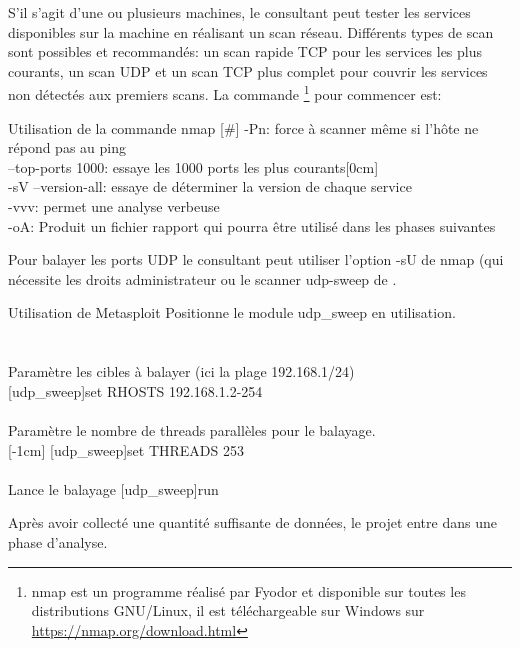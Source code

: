 \documentclass[twoside,a4paper,12pt,titlepage]{book}
\newcommand{\MarginPar}[2]{\marginnote{\scriptsize #1}[#2]}
\begin{document}
	S'il s'agit d'une ou plusieurs machines, le consultant peut tester les services disponibles sur la machine en réalisant un scan réseau. Différents types de scan sont possibles et recommandés: un scan rapide TCP pour les services les plus courants, un scan UDP et un scan TCP plus complet pour couvrir les services non détectés aux premiers scans. La commande \footnote{nmap est un programme réalisé par Fyodor et disponible sur toutes les distributions GNU/Linux, il est téléchargeable sur Windows sur \url{https://nmap.org/download.html}} pour commencer est:
\begin{FlagConsole}{Utilisation de la commande nmap}
[\#]
\tcblower
-Pn: force à scanner même si l'hôte ne répond pas au ping\\
--top-ports 1000: essaye les 1000 ports les plus courants\MarginPar{\textbf{Scan Réseau TCP}}{0cm}\\
-sV --version-all: essaye de déterminer la version de chaque service\\
-vvv: permet une analyse verbeuse\\
-oA: Produit un fichier rapport qui pourra être utilisé dans les phases suivantes
\end{FlagConsole}

Pour balayer les ports UDP le consultant peut utiliser l'option -sU de nmap (qui nécessite les droits administrateur ou le scanner udp-sweep de .
\begin{FlagConsole}{Utilisation de Metasploit}
	Positionne le module udp\_sweep en utilisation.\\
	\\
	 \\
	Paramètre les cibles à balayer (ici la plage 192.168.1/24)\\
	[udp\_sweep]{set RHOSTS 192.168.1.2-254}\\
	 \\
	 Paramètre le nombre de threads parallèles pour le balayage.\\
	 \MarginPar{\textbf{Scan Réseau UDP}}{-1cm}
	[udp\_sweep]{set THREADS 253}\\
	 \\
	Lance le balayage
	[udp\_sweep]{run}\\
\end{FlagConsole}
Après avoir collecté une quantité suffisante de données, le projet entre dans une phase d'analyse.
\end{document}
